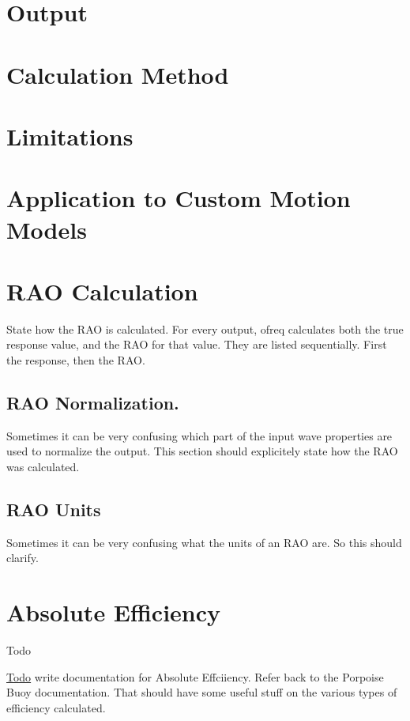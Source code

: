 \section*{Output}

\section*{Calculation Method}

\section*{Limitations}

\section*{Application to Custom Motion Models}

\section*{R\-A\-O Calculation}

State how the R\-A\-O is calculated. For every output, ofreq calculates both the true response value, and the R\-A\-O for that value. They are listed sequentially. First the response, then the R\-A\-O.

\subsection*{R\-A\-O Normalization.}

Sometimes it can be very confusing which part of the input wave properties are used to normalize the output. This section should explicitely state how the R\-A\-O was calculated.

\subsection*{R\-A\-O Units}

Sometimes it can be very confusing what the units of an R\-A\-O are. So this should clarify. \hypertarget{efficiency_absolute}{}\section{Absolute Efficiency}\label{efficiency_absolute}
\begin{DoxyRefDesc}{Todo}
\item[\hyperlink{todo__todo000016}{Todo}]write documentation for Absolute Effciiency. Refer back to the Porpoise Buoy documentation. That should have some useful stuff on the various types of efficiency calculated.\end{DoxyRefDesc}


